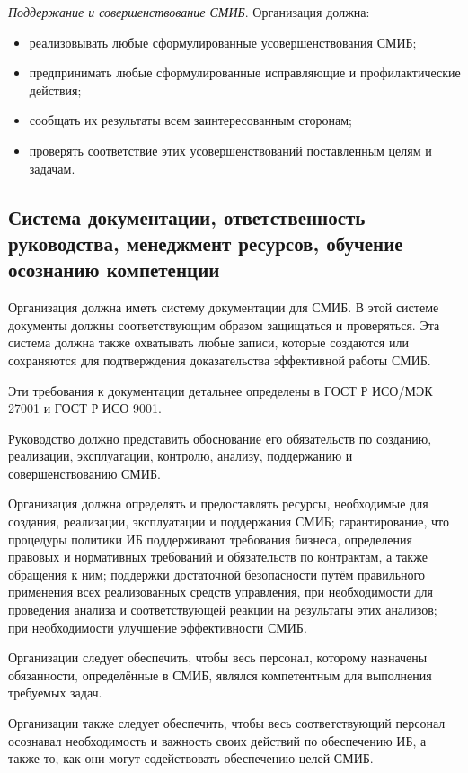 \documentclass[12pt, russian, oneside, article]{ncc}
\begin{document}
\emph{Поддержание и совершенствование СМИБ}. Организация должна:
\begin{itemize}
\item реализовывать любые сформулированные усовершенствования СМИБ;
\item предпринимать любые сформулированные исправляющие и профилактические действия;
\item сообщать их результаты всем заинтересованным сторонам;
\item проверять соответствие этих усовершенствований поставленным целям и задачам.
\end{itemize}
\subsection{Система документации, ответственность руководства, менеджмент ресурсов, обучение осознанию компетенции}
\label{sec-4_3}


Организация должна иметь систему документации для СМИБ. В этой системе документы должны соответствующим образом защищаться и проверяться. Эта система должна также охватывать любые записи, которые создаются или сохраняются для подтверждения доказательства эффективной работы СМИБ.

Эти требования к документации детальнее определены в ГОСТ Р ИСО/МЭК 27001 и ГОСТ Р ИСО 9001.

Руководство должно представить обоснование его обязательств по созданию, реализации, эксплуатации, контролю, анализу, поддержанию и совершенствованию СМИБ.

Организация должна определять и предоставлять ресурсы, необходимые для создания, реализации, эксплуатации и поддержания СМИБ; гарантирование, что процедуры политики ИБ поддерживают требования бизнеса, определения правовых и нормативных требований и обязательств по контрактам, а также обращения к ним; поддержки достаточной безопасности путём правильного применения всех реализованных средств управления, при необходимости для проведения анализа и соответствующей реакции на результаты этих анализов; при необходимости улучшение эффективности СМИБ.

Организации следует обеспечить, чтобы весь персонал, которому назначены обязанности, определённые в СМИБ, являлся компетентным для выполнения требуемых задач.

Организации также следует обеспечить, чтобы весь соответствующий персонал осознавал необходимость и важность своих действий по обеспечению ИБ, а также то, как они могут содействовать обеспечению целей СМИБ.
\end{document}
